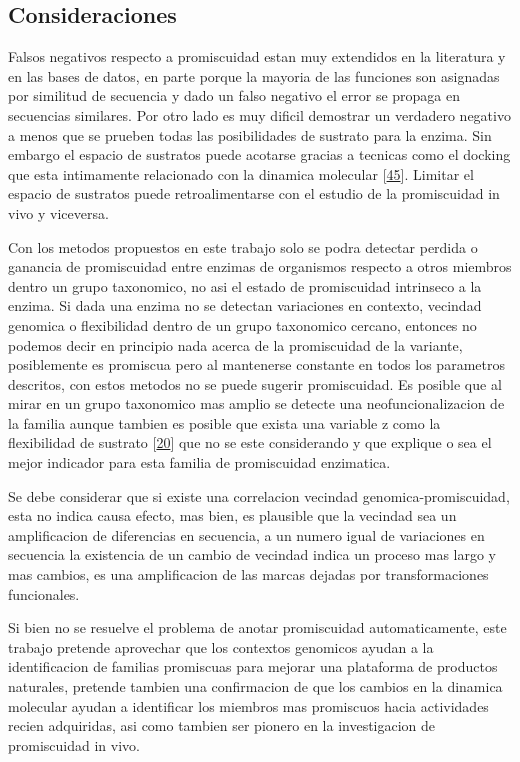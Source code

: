 \documentclass[12pt,twoside]{reedthesis}
\begin{document}
  \subsection{Consideraciones}\label{consideraciones}
  
  Falsos negativos respecto a promiscuidad estan muy extendidos en la
  literatura y en las bases de datos, en parte porque la mayoria de las
  funciones son asignadas por similitud de secuencia y dado un falso
  negativo el error se propaga en secuencias similares. Por otro lado es
  muy dificil demostrar un verdadero negativo a menos que se prueben todas
  las posibilidades de sustrato para la enzima. Sin embargo el espacio de
  sustratos puede acotarse gracias a tecnicas como el docking que esta
  intimamente relacionado con la dinamica molecular
  {[}\protect\hyperlink{ref-campbell_biophysical_2012}{45}{]}. Limitar el
  espacio de sustratos puede retroalimentarse con el estudio de la
  promiscuidad in vivo y viceversa.
  
  Con los metodos propuestos en este trabajo solo se podra detectar
  perdida o ganancia de promiscuidad entre enzimas de organismos respecto
  a otros miembros dentro un grupo taxonomico, no asi el estado de
  promiscuidad intrinseco a la enzima. Si dada una enzima no se detectan
  variaciones en contexto, vecindad genomica o flexibilidad dentro de un
  grupo taxonomico cercano, entonces no podemos decir en principio nada
  acerca de la promiscuidad de la variante, posiblemente es promiscua pero
  al mantenerse constante en todos los parametros descritos, con estos
  metodos no se puede sugerir promiscuidad. Es posible que al mirar en un
  grupo taxonomico mas amplio se detecte una neofuncionalizacion de la
  familia aunque tambien es posible que exista una variable z como la
  flexibilidad de sustrato
  {[}\protect\hyperlink{ref-nobeli_protein_2009}{20}{]} que no se este
  considerando y que explique o sea el mejor indicador para esta familia
  de promiscuidad enzimatica.
  
  Se debe considerar que si existe una correlacion vecindad
  genomica-promiscuidad, esta no indica causa efecto, mas bien, es
  plausible que la vecindad sea un amplificacion de diferencias en
  secuencia, a un numero igual de variaciones en secuencia la existencia
  de un cambio de vecindad indica un proceso mas largo y mas cambios, es
  una amplificacion de las marcas dejadas por transformaciones
  funcionales.
  
  Si bien no se resuelve el problema de anotar promiscuidad
  automaticamente, este trabajo pretende aprovechar que los contextos
  genomicos ayudan a la identificacion de familias promiscuas para mejorar
  una plataforma de productos naturales, pretende tambien una confirmacion
  de que los cambios en la dinamica molecular ayudan a identificar los
  miembros mas promiscuos hacia actividades recien adquiridas, asi como
  tambien ser pionero en la investigacion de promiscuidad in vivo.
  
\end{document}
